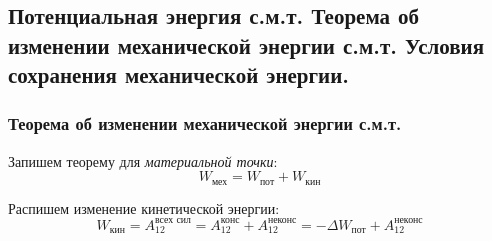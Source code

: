 \subsection{Потенциальная энергия с.м.т. \textbf{Теорема об изменении механической энергии с.м.т. Условия сохранения механической энергии.}}

\subsubsection*{Теорема об изменении механической энергии с.м.т.}
Запишем теорему для \textit{материальной точки}:
\[W_{\text{мех}} = W_{\text{пот}} + W_{\text{кин}}\]

Распишем изменение кинетической энергии:
\[W_{\text{кин}} = A_{12}^{\text{всех сил}} = A_{12}^{\text{конс}} + A_{12}^{\text{неконс}} = -\Delta W_{\text{пот}} + A_{12}^{\text{неконс}}\]